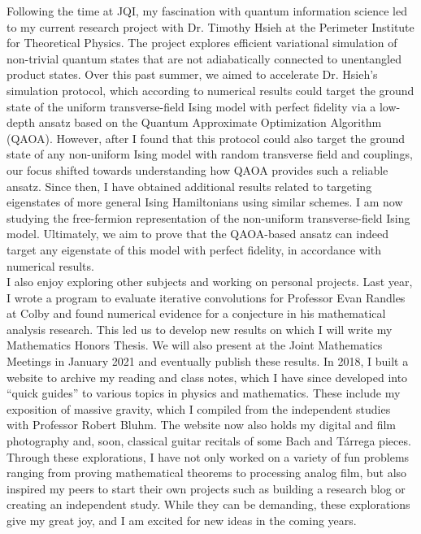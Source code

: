 \documentclass[12pt]{article}
\begin{document}
Following the time at JQI, my fascination with quantum information science led to my current research project with Dr. Timothy Hsieh at the Perimeter Institute for Theoretical Physics. The project explores efficient variational simulation of non-trivial quantum states that are not adiabatically connected to unentangled product states. Over this past summer, we aimed to accelerate Dr. Hsieh's simulation protocol, which according to numerical results could target the ground state of the uniform transverse-field Ising model with perfect fidelity via a low-depth ansatz based on the Quantum Approximate Optimization Algorithm (QAOA). However, after I found that this protocol could also target the ground state of any non-uniform Ising model with random transverse field and couplings, our focus shifted towards understanding how QAOA provides such a reliable ansatz. Since then, I have obtained additional results related to targeting eigenstates of more general Ising Hamiltonians using similar schemes. I am now studying the free-fermion representation of the non-uniform transverse-field Ising model. Ultimately, we aim to prove that the QAOA-based ansatz can indeed target any eigenstate of this model with perfect fidelity, in accordance with numerical results.  \\

I also enjoy exploring other subjects and working on personal projects. Last year, I wrote a program to evaluate iterative convolutions for Professor Evan Randles at Colby and found numerical evidence for a conjecture in his mathematical analysis research. This led us to develop new results on which I will write my Mathematics Honors Thesis. We will also present at the Joint Mathematics Meetings in January 2021 and eventually publish these results. In 2018, I built a website to archive my reading and class notes, which I have since developed into ``quick guides'' to various topics in physics and mathematics. These include my exposition of massive gravity, which I compiled from the independent studies with Professor Robert Bluhm. The website now also holds my digital and film photography and, soon, classical guitar recitals of some Bach and T\'{a}rrega pieces. Through these explorations, I have not only worked on a variety of fun problems ranging from proving mathematical theorems to processing analog film, but also inspired my peers to start their own projects such as building a research blog or creating an independent study. While they can be demanding, these explorations give my great joy, and I am excited for new ideas in the coming years.  \\
\end{document}
